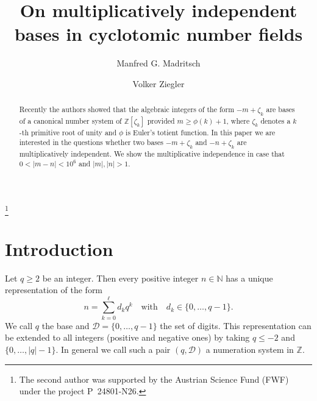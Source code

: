 \documentclass{amsart}
\theoremstyle{plain}
\numberwithin{equation}{section}
\theoremstyle{remark}
\begin{document}
\title[On multiplicatively independent bases]
{On multiplicatively independent bases in cyclotomic number fields}

\author[M. G. Madritsch]{Manfred G. Madritsch}
\address{Manfred Madritsch\newline
{}. Universit\'e de Lorraine, Institut Elie Cartan de Lorraine, UMR 7502, Vandoeuvre-l\`es-Nancy, F-54506, France;\newline
{}. CNRS, Institut Elie Cartan de Lorraine, UMR 7502, Vandoeuvre-l\`es-Nancy, F-54506, France}

\author{Volker Ziegler}
\address{Volker Ziegler\newline
\noindent Johann Radon Institute for Computational and Applied Mathematics (RICAM)\newline
\noindent Austrian Academy of Sciences\newline
\noindent Altenbergerstr. 69\newline
\noindent A-4040 Linz, Austria}
\thanks{The second author was supported by the Austrian Science Fund (FWF) under the project P~24801-N26.}

\begin{abstract}
  Recently the authors \cite{Madritsch:2014} showed that the algebraic
  integers of the form $-m+\zeta_k$ are bases of a canonical number
  system of ${{\mathbb Z}}[\zeta_k]$ provided $m\geq \phi(k)+1$, where $\zeta_k$
  denotes a $k$-th primitive root of unity and $\phi$ is Euler's
  totient function. In this paper we are interested in the questions
  whether two bases $-m+\zeta_k$ and $-n+\zeta_k$ are multiplicatively
  independent. We show the multiplicative independence in case that
  $0<|m-n|<10^6$ and $|m|,|n|> 1$.
\end{abstract}


\maketitle

\section{Introduction}

Let $q\geq2$ be an integer. Then every positive integer $n\in{{\mathbb N}}$ has a
unique representation of the form
\[n=\sum_{k=0}^\ell d_kq^k \quad\text{with}\quad
d_k\in\{0,\ldots,q-1\}.\] We call $q$ the base and
$\mathcal D=\{0,\ldots,q-1\}$ the set of digits. This representation can be
extended to all integers (positive and negative ones) by taking $q\leq
-2$ and $\{0,\ldots,\lvert q\rvert-1\}$. In general we call such a
pair $(q,\mathcal D)$ a numeration system in ${{\mathbb Z}}$.
\end{document}
